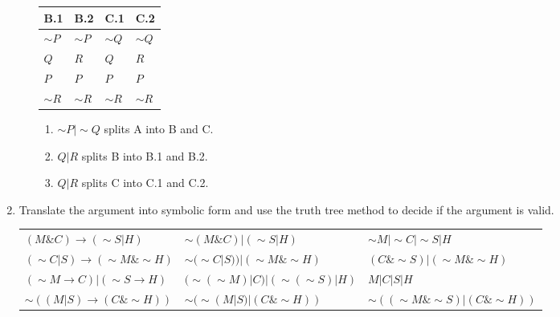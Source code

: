 \documentclass{article}
\begin{document}
\begin{enumerate}
\begin{enumerate}
        \begin{center}
            \setlength{\tabcolsep}{10pt}
            \centering
            \begin{tabular}{ p{1cm}|p{1cm}|p{1cm}|p{1cm} }
                B.1 & B.2 & C.1 & C.2\\
                \hline
                $\sim P$ & $\sim P$ & $\sim Q$ & $\sim Q$\\
                $Q$      & $R$      & $Q$      & $R$\\ 
                $P$      & $P$      & $P$      & $P$\\
                $\sim R$ & $\sim R$ & $\sim R$ & $\sim R$\\
            \end{tabular}
        \end{center}

            \vspace{20px}
            \begin{enumerate}
                \item $\sim P| \sim Q$ splits A into B and C. 
                \item $Q|R$ splits B into B.1 and B.2.
                \item $Q|R$ splits C into C.1 and C.2.
            \end{enumerate}

    \end{enumerate}

    \newpage
    \item Translate the argument into symbolic form and use the
    truth tree method to decide if the argument is valid.



    \begin{tabular}{ p{12em} p{12em} p{15em}}
        $(M \& C) \rightarrow (\sim S|H)$ & $\sim(M \& C) | (\sim S|H)$ & $\sim M | \sim C | \sim S|H$\\
        $(\sim C|S) \rightarrow (\sim M \& \sim H)$ & $\sim(\sim C|S)) | (\sim M \& \sim H)$ & $(C \& \sim S) | (\sim M \& \sim H)$\\ 
        $(\sim M \rightarrow C) | (\sim S \rightarrow H)$ & $(\sim(\sim M) | C) | (\sim(\sim S) | H)$ & $M | C | S | H$\\
        $\sim ((M|S) \rightarrow (C\& \sim H))$ & $\sim (\sim(M|S) | (C\& \sim H))$ & $\sim ((\sim M \& \sim S) | (C\& \sim H))$\\
    \end{tabular}


\end{enumerate}
\end{document}
